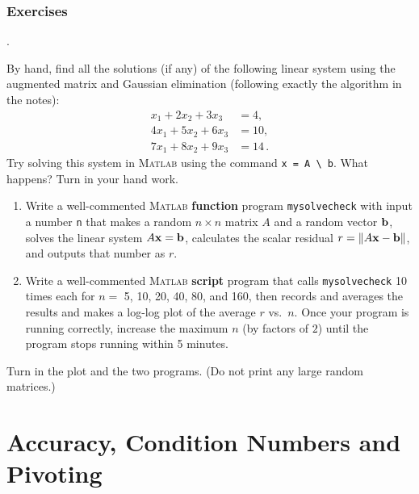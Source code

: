 \subsection*{Exercises}
\nobreak
\begin{list}
  {.}{}


\item By hand, find all the solutions (if any) of the following linear
  system using the augmented matrix and Gaussian elimination (following exactly
  the algorithm in the notes):
  \begin{equation*}
    \begin{split}
      x_1 + 2 x_2 + 3 x_3 & = 4, \\
      4 x_1 + 5 x_2 + 6 x_3 & = 10, \\
      7 x_1 + 8 x_2 + 9 x_3 & = 14 \,.
    \end{split}
  \end{equation*}
Try solving this system in \textsc{Matlab} using the command \verb&x = A \ b&. What happens?
Turn in your hand work.

\item
  \begin{enumerate}
  \item[(a)] Write a well-commented \textsc{Matlab} {\bf function}
    program \verb&mysolvecheck& with input a number \verb&n& that
    makes a random $n \times n$ matrix $A$ and a random vector $\mathbf{b}$,
    solves the linear system $A \mathbf{x} = \mathbf{b}$, calculates the scalar
    residual $r = \|A \mathbf{x} - \mathbf{b}\|$, and outputs that number as  $r$.
  \item[(b)] Write a well-commented \textsc{Matlab} {\bf script}
    program that calls \verb&mysolvecheck& 10 times each for $n = $
    5, 10, 20, 40, 80, and 160, then records and averages the
    results and makes a log-log plot of the average $r$ vs.\ $n$. 
    Once your program is running correctly, increase the maximum $n$ (by factors of $2$) until the program stops running 
    within 5 minutes.
  \end{enumerate}
  Turn in the plot and the two programs. (Do not print any large random matrices.)
\end{list}



\chapter{Accuracy, Condition Numbers and Pivoting}

